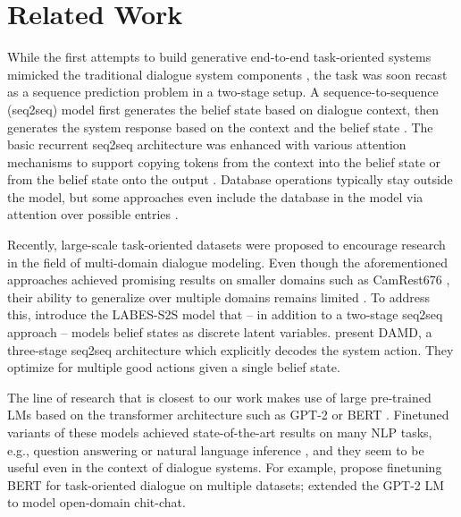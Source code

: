 \documentclass[letterpaper]{article} %
\begin{document}
\section{Related Work}
While the first attempts to build generative end-to-end task-oriented systems mimicked the traditional dialogue system components \citep{wen2017}, the task was soon recast as a sequence prediction problem in a two-stage setup. A sequence-to-sequence (seq2seq) model first generates the belief state based on dialogue context, then generates the system response based on the context and the belief state \cite[Sequicity;][]{lei2018}.
The basic recurrent seq2seq architecture \cite{sutskever2014} was enhanced with various attention mechanisms to support copying tokens from the context into the belief state or from the belief state onto the output \cite{wu2018, shu2019}. Database operations typically stay outside the model, but some approaches even include the database in the model via attention over possible entries \cite{manning2017,wen2018,madotto2018}. 

Recently, large-scale task-oriented datasets were proposed \cite{budzianowski2018, byrne2019, rastogi2019} to encourage research in the field of multi-domain dialogue modeling. 
Even though the aforementioned approaches achieved promising results on smaller domains such as CamRest676 \cite{wen2016}, their ability to generalize over multiple domains remains limited \cite{zhang2019}. 
To address this, \citet{zhang2020end2end} introduce the LABES-S2S model that -- in addition to a two-stage seq2seq approach -- models belief states as discrete latent variables.
\citet{zhang2019} present DAMD, a three-stage seq2seq architecture which explicitly decodes the system action. They optimize for multiple good actions given a single belief state.

The line of research that is closest to our work makes use of large pre-trained LMs 
based on the transformer architecture \cite{vaswani2017} such as GPT-2 \cite{radford2019} or BERT \cite{devlin2019}. 
Finetuned variants of these models achieved state-of-the-art results on many NLP tasks, e.g., question answering or natural language inference \cite{liu2020},  
and they seem to be useful even in the context of dialogue systems. 
For example, \citet{wu2020} %
propose finetuning BERT \cite{devlin2019} for task-oriented dialogue on multiple datasets; 
\citet{zhang2020dialogpt} extended the GPT-2 LM to model open-domain chit-chat.
\end{document}
